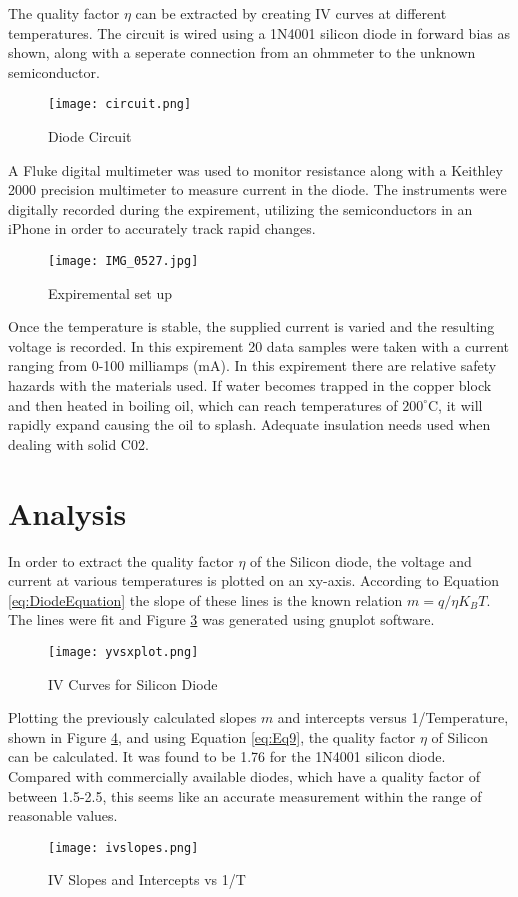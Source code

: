 \documentclass[twocolumn,11pt]{article}
\begin{document}
The quality factor $\eta$ can be extracted by creating IV curves at different temperatures. The circuit is wired using a 1N4001 silicon diode in forward bias as shown, along with a seperate connection from an ohmmeter to the unknown semiconductor. 
\begin{figure}[!h!t]
	\centering
		\texttt{[image: circuit.png]}
	\caption{Diode Circuit}
	\label{fig:circuit}
\end{figure} 

A Fluke digital multimeter was used to monitor resistance along with a Keithley 2000 precision multimeter to measure current in the diode. The instruments were digitally recorded during the expirement, utilizing the semiconductors in an iPhone in order to accurately track rapid changes.
\begin{figure}[!h!t]
	\centering
		\texttt{[image: IMG\_0527.jpg]}
	\caption{Expiremental set up}
	\label{fig:setup}
\end{figure} 

Once the temperature is stable, the supplied current is varied and the resulting voltage is recorded. In this expirement 20 data samples were taken with a current ranging from 0-100 milliamps (mA). 
In this expirement there are relative safety hazards with the materials used. If water becomes trapped in the copper block and then heated in boiling oil, which can reach temperatures of $200^\circ$C, it will rapidly expand causing the oil to splash. Adequate insulation needs used when dealing with solid C02.
\section*{Analysis}
In order to extract the quality factor $\eta $ of the Silicon diode, the voltage and current at various temperatures is plotted on an xy-axis. According to Equation \ref{eq:DiodeEquation} the slope of these lines is the known relation $m=q/\eta{}K_BT$. The lines were fit and Figure \ref{fig:IV curves} was generated using gnuplot software.
\begin{figure}[!h!t]
	\centering
		\texttt{[image: yvsxplot.png]}
		\caption{IV Curves for Silicon Diode}
	\label{fig:IV curves}
\end{figure} 


Plotting the previously calculated slopes $m$ and intercepts versus 1/Temperature, shown in Figure \ref{fig:IVslopes}, and using Equation \ref{eq:Eq9}, the quality factor $\eta$ of Silicon can be calculated. It was found to be 1.76 for the 1N4001 silicon diode. Compared with commercially available diodes, which have a quality factor of between 1.5-2.5, this seems like an accurate measurement within the range of reasonable values.
\begin{figure}[!h!t]
	\centering
		\texttt{[image: ivslopes.png]}
		\caption{IV Slopes and Intercepts vs 1/T}
	\label{fig:IVslopes}
\end{figure} 
\end{document}
